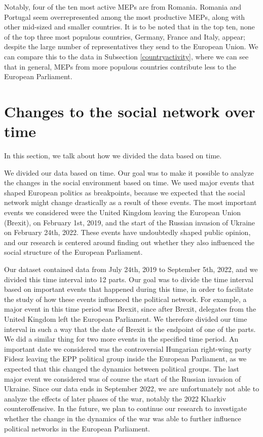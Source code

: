 \documentclass[lettersize,journal]{IEEEtran}
\begin{document}
Notably, four of the ten most active MEPs are from Romania. Romania and Portugal seem overrepresented among the most productive MEPs, along with other mid-sized and smaller countries. It is to be noted that in the top ten, none of the top three most populous countries, Germany, France and Italy, appear; despite the large number of representatives they send to the European Union. We can compare this to the data in Subsection \ref{countryactivity}, where we can see that in general, MEPs from more populous countries contribute less to the European Parliament.

\section{Changes to the social network over time} \label{sec:overtime_anal}

In this section, we talk about how we divided the data based on time.

We divided our data based on time. Our goal was to make it possible to analyze the changes in the social environment based on time. We used major events that shaped European politics as breakpoints, because we expected that the social network might change drastically as a result of these events. The most important events we considered were the United Kingdom leaving the European Union (Brexit), on February 1st, 2019, and the start of the Russian invasion of Ukraine on February 24th, 2022. These events have undoubtedly shaped public opinion, and our research is centered around finding out whether they also influenced the social structure of the European Parliament.

Our dataset contained data from July 24th, 2019 to September 5th, 2022, and we divided this time interval into 12 parts. Our goal was to divide the time interval based on important events that happened during this time, in order to facilitate the study of how these events influenced the political network. For example, a major event in this time period was Brexit, since after Brexit, delegates from the United Kingdom left the European Parliament. We therefore divided our time interval in such a way that the date of Brexit is the endpoint of one of the parts. We did a similar thing for two more events in the specified time period. An important date we considered was the controversial Hungarian right-wing party Fidesz leaving the EPP political group inside the European Parliament, as we expected that this changed the dynamics between political groups. The last major event we considered was of course the start of the Russian invasion of Ukraine. Since our data ends in September 2022, we are unfortunately not able to analyze the effects of later phases of the war, notably the 2022 Kharkiv counteroffensive. In the future, we plan to continue our research to investigate whether the change in the dynamics of the war was able to further influence political networks in the European Parliament.
\end{document}
